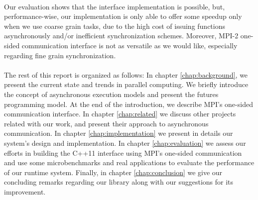 \paragraph{}
Our evaluation shows that the interface implementation is possible, but, performance-wise,  our implementation 
is only able to offer some speedup only when we use coarse grain tasks, due to the high cost of issuing functions 
asynchronously and/or inefficient synchronization schemes. Moreover, MPI-2 one-sided communication interface is 
not as versatile as we would like, especially regarding fine grain synchronization.  

\paragraph{}
The rest of this report is organized as follows:  In chapter \ref{chap:background}, we present the current state
and trends in parallel computing.  We briefly introduce the concept of asynchronous execution models and present
the futures programming model.  At the end of the introduction, we describe MPI's one-sided communication interface.
In chapter \ref{chap:related} we discuss other projects related with our work, and present their approach to
asynchronous communication.  In chapter \ref{chap:implementation} we present in details our system's design and 
implementation.  In chapter \ref{chap:evaluation} we assess our efforts in building the C++11 interface using 
MPI's one-sided communication and use some microbenchmarks and real applications to evaluate the performance
of our runtime system.  Finally, in chapter \ref{chap:conclusion} we give our concluding remarks regarding our
library along with our suggestions for its improvement.    

